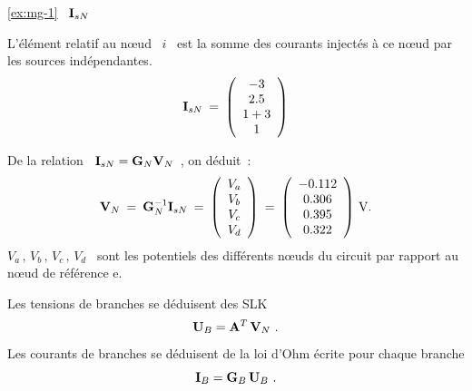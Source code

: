 \begin{solexercise}{\ref{ex:mg-1}}
 \ ${\bf I}_{sN}$

L'élément relatif au nœud \ $i$ \ est la somme des courants injectés
à ce nœud par les sources indépendantes.
\[ {\bf I}_{sN} \: = \: \left( \begin{array}{c}
-3 \\ 2.5 \\ 1+3 \\ 1
\end{array} \right)  \]


De la relation \ ${\bf I}_{sN} = {\bf G}_N {\bf V}_N$~, on déduit~:
\[ {\bf V}_N \: = \: {\bf G}_N ^{-1} {\bf I}_{sN}\: = \: 
\left( \begin{array}{c} V_a \\ V_b \\ V_c \\ V_d \end{array} \right)
\: = \: \left( \begin{array}{c} -0.112 \\ 0.306 \\ 0.395 \\ 0.322
\end{array} \right) \, \text{V.} \] 
$V_a\, , \, V_b\, , \,V_c\, , \,V_d$ \
sont les potentiels des différents nœuds du circuit par rapport au
nœud de référence e.


Les tensions de branches se déduisent des SLK
\[ {\bf U}_B = {\bf A}^T\, {\bf V}_N~. \]
Les courants de branches se déduisent de la loi d'Ohm écrite pour chaque branche
\[ {\bf I}_B = {\bf G}_B\, {\bf U}_B~. \]


\end{solexercise}
